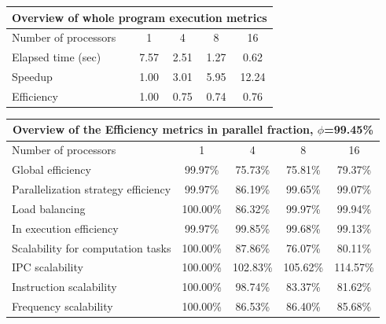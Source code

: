 \begin{tabular}{|l|c|c|c|c|}
\hline
\multicolumn{5}{|c|}{Overview of whole program execution metrics} \\
\hline
\hline
Number of processors & 1 & 4 & 8 & 16 \\
\hline
Elapsed time (sec)      &       7.57 &       2.51 &       1.27 &       0.62 \\
\hline
Speedup                 &       1.00 &       3.01 &       5.95 &      12.24 \\
\hline
Efficiency              &       1.00 &       0.75 &       0.74 &       0.76 \\
\hline
\end{tabular}
\vspace{2mm}
\begin{tabular}{|l|c|c|c|c|}
\hline
\multicolumn{5}{|c|}{Overview of the Efficiency metrics in parallel fraction, $\phi$=99.45\%} \\
\hline
\hline
Number of processors & 1 & 4 & 8 & 16 \\
\hline
\hline
Global efficiency                      &     99.97\% &     75.73\% &     75.81\% &     79.37\% \\
\hline
\hline
Parallelization strategy efficiency &     99.97\% &     86.19\% &     99.65\% &     99.07\% \\
\hline
Load balancing                   &    100.00\% &     86.32\% &     99.97\% &     99.94\% \\
In execution efficiency          &     99.97\% &     99.85\% &     99.68\% &     99.13\% \\
\hline
\hline
Scalability for computation tasks   &    100.00\% &     87.86\% &     76.07\% &     80.11\% \\
\hline
IPC scalability                  &    100.00\% &    102.83\% &    105.62\% &    114.57\% \\
Instruction scalability          &    100.00\% &     98.74\% &     83.37\% &     81.62\% \\
Frequency scalability            &    100.00\% &     86.53\% &     86.40\% &     85.68\% \\
\hline
\end{tabular}
\vspace{2mm}
